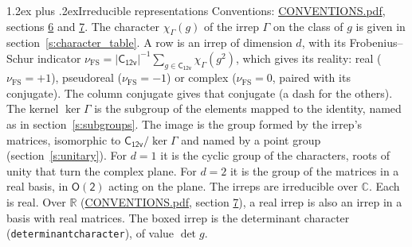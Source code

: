 \documentclass[10pt,a4paper]{article}
\makeatletter
\renewcommand\section{\@startsection{section}{1}{\z@}{-3ex plus -1ex minus -.2ex}%
  {1.2ex plus .2ex}{\normalfont\large\sffamily\bfseries\color{parttitle}}}
\numberwithin{equation}{section}
\newcommand{\grp}[1]{\mathsf{#1}}
\newcommand{\irchar}[1]{\chi_{#1}}
\newcommand{\fsind}{\nu_{\mathrm{FS}}}
\makeatother
\begin{document}
\section{Irreducible representations}\label{s:irreps}
Conventions: \href{../../CONVENTIONS.pdf}{CONVENTIONS.pdf}, sections \href{../../CONVENTIONS.pdf\#conv.6}{6} and \href{../../CONVENTIONS.pdf\#conv.7}{7}.
\leavevmode\label{n:function.character}\label{n:irrep.Gamma}The character $\irchar{\Gamma}(g)$ of the irrep $\Gamma$ on the class of $g$ is given in section~\ref{s:character_table}.
\leavevmode\label{n:index.dimension}\label{n:index.frobenius}\label{n:head.irrep}\label{n:head.reality}A row is an irrep of dimension $d$, with its Frobenius--Schur indicator $\fsind = |\grp{C_{12v}}|^{-1}\allowbreak\sum_{g\in\grp{C_{12v}}}\irchar{\Gamma}(g^2)$, which gives its reality: real ($\fsind = +1$), pseudoreal ($\fsind = -1$) or complex ($\fsind = 0$, paired with its conjugate). \label{n:head.conjugate}The column conjugate gives that conjugate (a dash for the others). \label{n:head.kernel}The kernel $\ker\Gamma$ is the subgroup of the elements mapped to the identity, named as in section~\ref{s:subgroups}. \label{n:head.image}The image is the group formed by the irrep's matrices, isomorphic to $\grp{C_{12v}}/\ker\Gamma$ and named by a point group (section~\ref{s:unitary}). For $d = 1$ it is the cyclic group of the characters, roots of unity that turn the complex plane. For $d = 2$ it is the group of the matrices in a real basis, in $\grp{O(2)}$ acting on the plane. The irreps are irreducible over $\mathbb{C}$. Each is real. Over $\mathbb{R}$ (\href{../../CONVENTIONS.pdf}{CONVENTIONS.pdf}, section \href{../../CONVENTIONS.pdf\#conv.7}{7}), a real irrep is also an irrep in a basis with real matrices. \label{n:mark.determinant}The boxed irrep is the determinant character (\texttt{determinantcharacter}), of value $\det g$.
\setlength{\emergencystretch}{2em}\par\setlength{\emergencystretch}{0pt}
\end{document}
